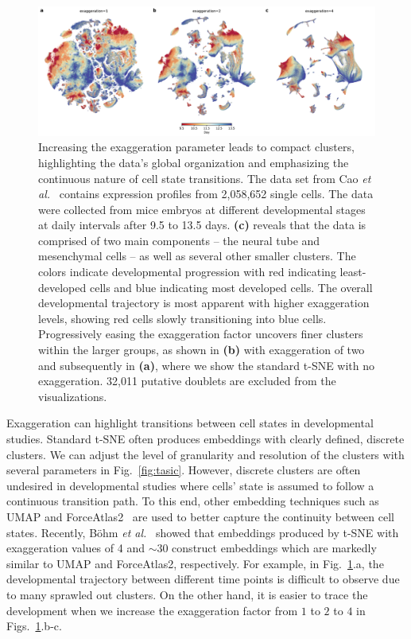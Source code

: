 \documentclass[letter]{article}
\begin{document}
\begin{figure}[htbp]
  \includegraphics[width=\textwidth]{cao2019}
  \caption{\label{fig:cao}
  Increasing the exaggeration parameter leads to compact clusters, highlighting
	the data's global organization and emphasizing the continuous nature of
	cell state transitions. The data set from Cao \textit{et al.}~\cite{cao2019single}
	contains expression profiles from 2,058,652 single cells. The data were
	collected from mice embryos at different developmental stages at daily
	intervals after 9.5 to 13.5 days. \textbf{(c)} reveals that the data is
	comprised of two main components -- the neural tube and mesenchymal
	cells -- as well as several other smaller clusters. The
	colors indicate developmental progression with red indicating
	least-developed cells and blue indicating most developed cells. The
	overall developmental trajectory is most apparent with higher
	exaggeration levels, showing red cells slowly transitioning into blue
	cells. Progressively easing the exaggeration factor uncovers finer
	clusters within the larger groups, as shown in \textbf{(b)} with
	exaggeration of two and subsequently in \textbf{(a)}, where we show the
	standard t-SNE with no exaggeration. 32,011 putative doublets are
	excluded from the visualizations.
}
\end{figure}

Exaggeration can highlight transitions between cell states in developmental
studies. Standard t-SNE often produces embeddings with clearly defined, discrete
clusters. We can adjust the level of granularity and resolution of the clusters
with several parameters in Fig.~\ref{fig:tasic}. However, discrete clusters are
often undesired in developmental studies where cells' state is assumed to follow
a continuous transition path. To this end, other embedding techniques such as UMAP and
ForceAtlas2~\cite{jacomy2014forceatlas2} are used to better capture the continuity
between cell states. Recently, B{\"o}hm \textit{et al.}~\cite{bohm2020unifying}
showed that embeddings produced by t-SNE with exaggeration values of 4 and
$\sim30$ construct embeddings which are markedly similar to UMAP and
ForceAtlas2, respectively. For example, in Fig.~\ref{fig:cao}.a, the
developmental trajectory between different time points is difficult to observe
due to many sprawled out clusters. On the other hand, it is easier to trace the
development when we increase the exaggeration factor from $1$ to $2$ to $4$ in
Figs.~\ref{fig:cao}.b-c.
\end{document}
